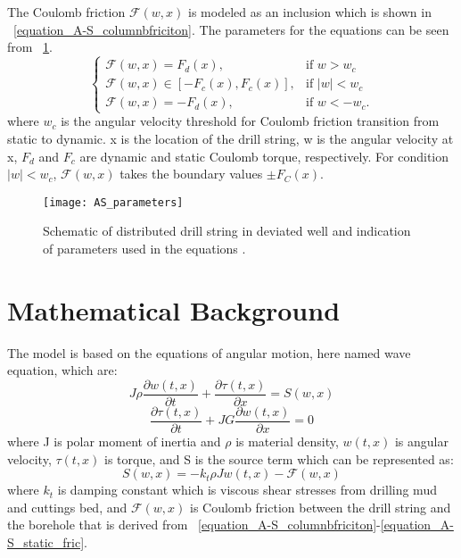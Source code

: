 The Coulomb friction $\mathcal{F}(w,x)$ is modeled as an inclusion which is shown in \equationname~\ref{equation_A-S_columnbfriciton}. The parameters for the equations can be seen from \figurename~\ref{figure_AS_equation_schematic}.
\begin{equation}\label{equation_A-S_columnbfriciton}
  \begin{cases}
     \mathcal{F}(w,x) = F_d(x), & \mbox{if } w>w_c \\
     \mathcal{F}(w,x) \in [-F_c(x), F_c(x)], & \mbox{if } |w|<w_c \ \\
     \mathcal{F}(w,x) = -F_d(x), & \mbox{if } w < -w_c.
  \end{cases}
\end{equation}
where $w_c$ is the angular velocity threshold for Coulomb friction transition from static to dynamic. x is the location of the drill string, w is the angular velocity at x, $F_d$ and $F_c$ are dynamic and static Coulomb torque, respectively. For condition $|w|<w_c$, $\mathcal{F}(w,x)$ takes the boundary values $\pm F_C(x)$.

\begin{figure}[!hpt]
  \centering
  \texttt{[image: AS\_parameters]}
  \caption[Schematic of distributed drill string in deviated well]{Schematic of distributed drill string in deviated well and indication of parameters used in the equations \cite{ref:aarsnes2017a}.}\label{figure_AS_equation_schematic}
\end{figure}

\section{Mathematical Background}\label{SubSec_AS_mathematicalbackground}
The model is based on the equations of angular motion, here named wave equation, which are:
\begin{equation}\label{AS-motion}
  J\rho\frac{\partial w(t,x)}{\partial t} + \frac{\partial \tau (t,x)}{\partial x} = S(w,x) 
\end{equation}
\begin{equation}
 \frac{\partial\tau(t,x)}{\partial t} + JG\frac{\partial w(t,x)}{\partial x} = 0 
\end{equation}
where J is polar moment of inertia and $\rho$ is material density, $w(t,x)$ is angular velocity, $\tau(t,x)$ is torque, and S is the source term which can be represented as:
\begin{equation}\label{AS-sourceterm}
  S(w,x) = -k_t \rho J w(t,x) - \mathcal{F}(w,x)
\end{equation}
where $k_t$ is damping constant which is viscous shear stresses from drilling mud and cuttings bed, and $\mathcal{F}(w,x)$ is Coulomb friction between the drill string and the borehole that is derived from \equationname~\ref{equation_A-S_columnbfriciton}-\ref{equation_A-S_static_fric}. 


